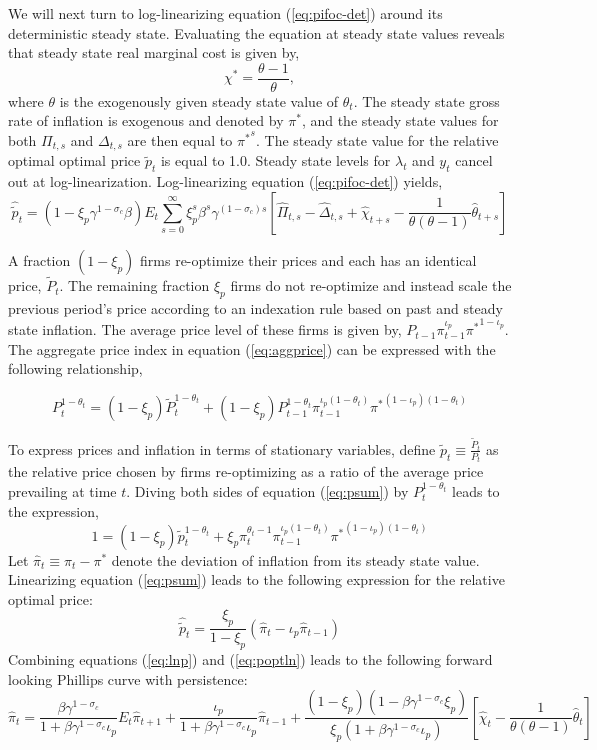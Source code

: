 \documentclass[11pt]{article}
\newcommand{\beq}{\begin{equation}}
\newcommand{\eeq}{\end{equation}}
\newcommand{\eqref}[1]{(\ref{#1})}
\begin{document}
We will next turn to log-linearizing equation (\ref{eq:pifoc-det}) around its deterministic steady state.  Evaluating the equation at steady state values reveals that steady state real marginal cost is given by,
\beq \label{eq:ssmc} \chi^* = \frac{\theta-1}{\theta}, \eeq
where $\theta$ is the exogenously given steady state value of $\theta_t$.  The steady state gross rate of inflation is exogenous and denoted by $\pi^*$, and the steady state values for both $\Pi_{t,s}$ and $\Delta_{t,s}$ are then equal to ${\pi^*}^s$.  The steady state value for the relative optimal optimal price $\tilde{p}_t$ is equal to 1.0.  Steady state levels for $\lambda_t$ and $y_t$ cancel out at log-linearization.  Log-linearizing equation (\ref{eq:pifoc-det}) yields,
\beq \label{eq:poptln} \hat{\tilde{p}}_t = (1-\xi_p \gamma^{1-\sigma_c}\beta) E_t \sum_{s=0}^{\infty} \xi_p^s \beta^s \gamma^{(1-\sigma_c)s} \left[ \hat{\Pi}_{t,s} - \hat{\Delta}_{t,s} + \hat{\chi}_{t+s} - \frac{1}{\theta(\theta-1)} \hat{\theta}_{t+s} \right] \eeq


A fraction $(1-\xi_p)$ firms re-optimize their prices and each has an identical price, $\tilde{P}_t$.  The remaining fraction $\xi_p$ firms do not re-optimize and instead scale the previous period's price according to an indexation rule based on past and steady state inflation.  The average price level of these firms is given by, $P_{t-1} \pi_{t-1}^{\iota_p} {\pi^*}^{1-\iota_p}$.  The aggregate price index in equation (\ref{eq:aggprice}) can be expressed with the following relationship,

\beq \label{eq:psum} P_t^{1-\theta_t} = (1-\xi_p) \tilde{P}_t^{1-\theta_t} + (1-\xi_p) P_{t-1}^{1-\theta_t} \pi_{t-1}^{\iota_p(1-\theta_t)} {\pi^*}^{(1-\iota_p)(1-\theta_t)} \eeq

To express prices and inflation in terms of stationary variables, define $\tilde{p}_t \equiv \frac{\tilde{P}_t}{P_t}$ as the relative price chosen by firms re-optimizing as a ratio of the average price prevailing at time $t$.  Diving both sides of equation (\ref{eq:psum}) by $P_t^{1-\theta_t}$ leads to the expression,
\beq 1 = (1-\xi_p) \tilde{p}_t^{1-\theta_t} + \xi_p \pi_t^{\theta_t-1} \pi_{t-1}^{\iota_p(1-\theta_t)} {\pi^*}^{(1-\iota_p)(1-\theta_t)} \eeq
Let $\hat{\pi}_t \equiv \pi_t - \pi^*$ denote the deviation of inflation from its steady state value.  Linearizing equation (\ref{eq:psum}) leads to the following expression for the relative optimal price:
\beq \label{eq:lnp} \hat{\tilde{p}}_t = \frac{\xi_p}{1-\xi_p} \left(\hat{\pi}_t - \iota_p \hat{\pi}_{t-1}\right) \eeq
Combining equations \eqref{eq:lnp} and \eqref{eq:poptln} leads to the following forward looking Phillips curve with persistence:
\beq \label{eq:phillip} \hat{\pi}_t = \frac{\beta \gamma^{1-\sigma_c}}{1+\beta \gamma^{1-\sigma_c} \iota_p} E_t \hat{\pi}_{t+1} + \frac{\iota_p}{1+\beta \gamma^{1-\sigma_c} \iota_p} \hat{\pi}_{t-1} + \frac{(1-\xi_p)(1-\beta \gamma^{1-\sigma_c} \xi_p)}{\xi_p(1+\beta \gamma^{1-\sigma_c} \iota_p)} \left[\hat{\chi}_t - \frac{1}{\theta(\theta-1)}\hat{\theta}_t \right] \eeq
\end{document}
